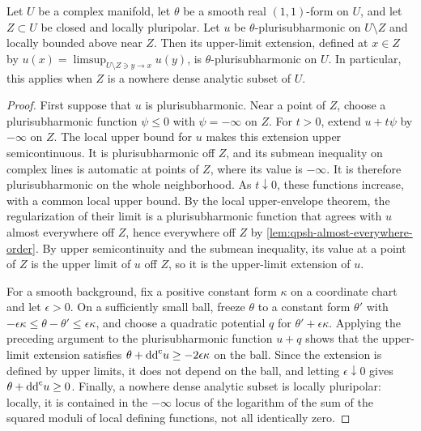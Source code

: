 \begin{lemma}\label{lem:qpsh-removable-analytic}\label{lem:qpsh-removable-pluripolar}
Let $U$ be a complex manifold, let $\theta$ be a smooth real $(1,1)$-form on $U$, and let $Z\subset U$ be closed and locally pluripolar. Let $u$ be $\theta$-plurisubharmonic on $U\setminus Z$ and locally bounded above near $Z$. Then its upper-limit extension, defined at $x\in Z$ by $u(x)=\limsup_{U\setminus Z\ni y\to x}u(y)$, is $\theta$-plurisubharmonic on $U$. In particular, this applies when $Z$ is a nowhere dense analytic subset of $U$.
\end{lemma}
\begin{proof}
First suppose that $u$ is plurisubharmonic. Near a point of $Z$, choose a plurisubharmonic function $\psi\leq0$ with $\psi=-\infty$ on $Z$. For $t>0$, extend $u+t\psi$ by $-\infty$ on $Z$. The local upper bound for $u$ makes this extension upper semicontinuous. It is plurisubharmonic off $Z$, and its submean inequality on complex lines is automatic at points of $Z$, where its value is $-\infty$. It is therefore plurisubharmonic on the whole neighborhood. As $t\downarrow0$, these functions increase, with a common local upper bound. By the local upper-envelope theorem, the regularization of their limit is a plurisubharmonic function that agrees with $u$ almost everywhere off $Z$, hence everywhere off $Z$ by \cref{lem:qpsh-almost-everywhere-order}. By upper semicontinuity and the submean inequality, its value at a point of $Z$ is the upper limit of $u$ off $Z$, so it is the upper-limit extension of $u$.

For a smooth background, fix a positive constant form $\kappa$ on a coordinate chart and let $\epsilon>0$. On a sufficiently small ball, freeze $\theta$ to a constant form $\theta'$ with $-\epsilon\kappa\leq\theta-\theta'\leq\epsilon\kappa$, and choose a quadratic potential $q$ for $\theta'+\epsilon\kappa$. Applying the preceding argument to the plurisubharmonic function $u+q$ shows that the upper-limit extension satisfies $\theta+\mathrm{dd}^{\mathrm{c}} u\geq-2\epsilon\kappa$ on the ball. Since the extension is defined by upper limits, it does not depend on the ball, and letting $\epsilon\downarrow0$ gives $\theta+\mathrm{dd}^{\mathrm{c}} u\geq0$. Finally, a nowhere dense analytic subset is locally pluripolar: locally, it is contained in the $-\infty$ locus of the logarithm of the sum of the squared moduli of local defining functions, not all identically zero.
\end{proof}

